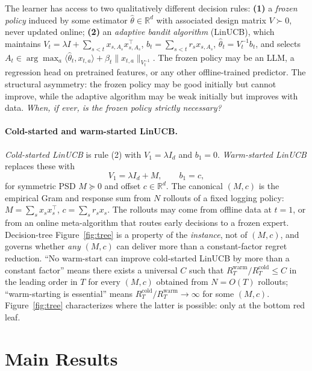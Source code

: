 \documentclass{article}
\theoremstyle{definition}
\theoremstyle{remark}
\theoremstyle{remark}
\begin{document}
The learner has access to two qualitatively different decision rules:
\textbf{(1)} a \emph{frozen policy} induced by some estimator
$\widehat\theta\!\in\!\mathbb R^d$ with associated design matrix
$V\!\succ\!0$, never updated online; \textbf{(2)} an \emph{adaptive bandit
algorithm} (LinUCB), which maintains
$V_t=\lambda I + \sum_{s<t}x_{s,A_s}x_{s,A_s}^\top$,
$b_t=\sum_{s<t}r_s x_{s,A_s}$, $\widehat\theta_t=V_t^{-1}b_t$, and selects
$A_t\!\in\!\arg\max_a\langle\widehat\theta_t,x_{t,a}\rangle+\beta_t\|x_{t,a}\|_{V_t^{-1}}$.
The frozen policy may be an LLM, a regression head on pretrained features, or
any other offline-trained predictor. The structural asymmetry: the frozen
policy may be good initially but cannot improve, while the adaptive algorithm
may be weak initially but improves with data. \emph{When, if ever, is the
frozen policy strictly necessary?}

\paragraph{Cold-started and warm-started LinUCB.}
\emph{Cold-started LinUCB} is rule (2) with $V_1=\lambda I_d$ and $b_1=0$.
\emph{Warm-started LinUCB} replaces these with
\begin{equation}
\label{eq:warm-start-def}
V_1 = \lambda I_d + M, \qquad b_1 = c,
\end{equation}
for symmetric PSD $M\!\succeq\!0$ and offset $c\!\in\!\mathbb R^d$. The
canonical $(M,c)$ is the empirical Gram and response sum from $N$ rollouts of
a fixed logging policy: $M=\sum_s x_sx_s^\top$, $c=\sum_s r_s x_s$. The
rollouts may come from offline data at $t=1$, or from an online meta-algorithm
that routes early decisions to a frozen expert. Decision-tree
Figure~\ref{fig:tree} is a property of the \emph{instance}, not of $(M,c)$,
and governs whether \emph{any} $(M,c)$ can deliver more than a constant-factor
regret reduction. ``No warm-start can improve cold-started LinUCB by more
than a constant factor'' means there exists a universal $C$ such that
$R_T^{\mathrm{warm}}/R_T^{\mathrm{cold}}\le C$ in the leading order in $T$
for every $(M,c)$ obtained from $N=O(T)$ rollouts; ``warm-starting is
essential'' means $R_T^{\mathrm{cold}}/R_T^{\mathrm{warm}}\to\infty$ for some
$(M,c)$. Figure~\ref{fig:tree} characterizes where the latter is possible:
only at the bottom red leaf.


\section{Main Results}
\label{sec:main-results}
\end{document}
